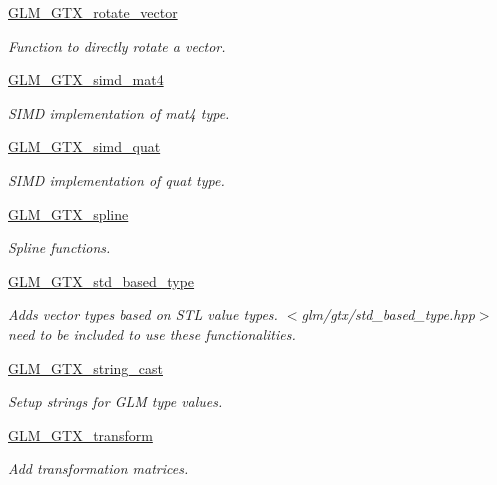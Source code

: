 \begin{CompactItemize}
\item 
\hyperlink{group__gtx__rotate__vector}{GLM\_\-GTX\_\-rotate\_\-vector}
\begin{CompactList}\small\item\em Function to directly rotate a vector. \item\end{CompactList}

\item 
\hyperlink{group__gtx__simd__mat4}{GLM\_\-GTX\_\-simd\_\-mat4}
\begin{CompactList}\small\item\em SIMD implementation of mat4 type. \item\end{CompactList}

\item 
\hyperlink{group__gtx__simd__vec4}{GLM\_\-GTX\_\-simd\_\-quat}
\begin{CompactList}\small\item\em SIMD implementation of quat type. \item\end{CompactList}

\item 
\hyperlink{group__gtx__spline}{GLM\_\-GTX\_\-spline}
\begin{CompactList}\small\item\em Spline functions. \item\end{CompactList}

\item 
\hyperlink{group__gtx__std__based__type}{GLM\_\-GTX\_\-std\_\-based\_\-type}
\begin{CompactList}\small\item\em Adds vector types based on STL value types. $<$glm/gtx/std\_\-based\_\-type.hpp$>$ need to be included to use these functionalities. \item\end{CompactList}

\item 
\hyperlink{group__gtx__string__cast}{GLM\_\-GTX\_\-string\_\-cast}
\begin{CompactList}\small\item\em Setup strings for GLM type values. \item\end{CompactList}

\item 
\hyperlink{group__gtx__transform}{GLM\_\-GTX\_\-transform}
\begin{CompactList}\small\item\em Add transformation matrices. \item\end{CompactList}


\end{CompactItemize}
